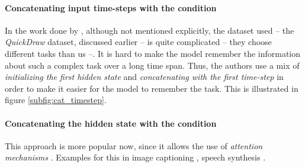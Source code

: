 \paragraph{Concatenating input time-steps with the condition} In the work done by \citep{ha2017neural}, although not mentioned explicitly, the dataset used -- the \textit{QuickDraw} dataset, discussed earlier -- is quite complicated -- they choose different tasks than us --. It is hard to make the model remember the information about such a complex task over a long time span. Thus, the authors use a mix of \textit{initializing the first hidden state} and \textit{concatenating with the first time-step} in order to make it easier for the model to remember the task. This is illustrated in figure \ref{subfig:cat_timestep}.

\paragraph{Concatenating the hidden state with the condition} This approach is more popular now, since it allows the use of \textit{attention mechanisms} \citep{NIPS2010_4089,denil2012learning}. Examples for this in image captioning \citep{xu2015show}, speech synthesis \citep{wang2017tacotron}.

